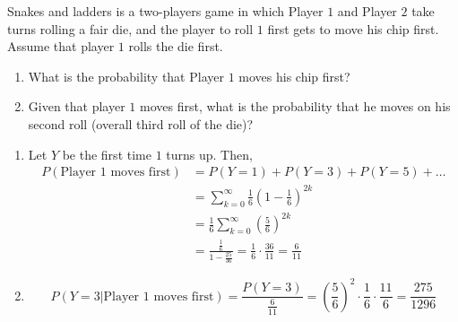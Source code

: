 \begin{example}
    Snakes and ladders is a two-players game in which Player $1$ and Player $2$
take turns rolling a fair die, and the player to roll $1$ first gets to move
his chip first. Assume that player $1$ rolls the die first.
\begin{enumerate}[noitemsep, topsep=0em]
    \item What is the probability that Player $1$ moves his chip first?
    \item Given that player $1$ moves first, what is the probability that he
moves on his second roll (overall third roll of the die)?
\end{enumerate}
\end{example}
\begin{solution}
    \begin{enumerate}[noitemsep, topsep=0em]
        \item 
        Let $Y$ be the first time $1$ turns up. Then,
        \begin{align*}
            P(\text{Player $1$ moves first})
                &= P(Y = 1) + P(Y = 3) + P(Y = 5) + \dots                    \\
                &= \sum_{k = 0}^\infty \frac{1}{6}(1 - \frac{1}{6})^{2k}     \\
                &= \frac{1}{6} \sum_{k = 0}^\infty (\frac{5}{6})^{2k}        \\
                &= \frac{\frac{1}{6}}{1 - \frac{25}{36}}
                 = \frac{1}{6} \cdot \frac{36}{11}
                 = \frac{6}{11}
        \end{align*}
        \item
        \[
            P(Y = 3 \vert \text{Player $1$ moves first})
                = \frac{P(Y = 3)}{\frac{6}{11}}                             
                = (\frac{5}{6})^2 \cdot \frac{1}{6} \cdot \frac{11}{6}      
                = \frac{275}{1296}
        \]
    \end{enumerate}
\end{solution}